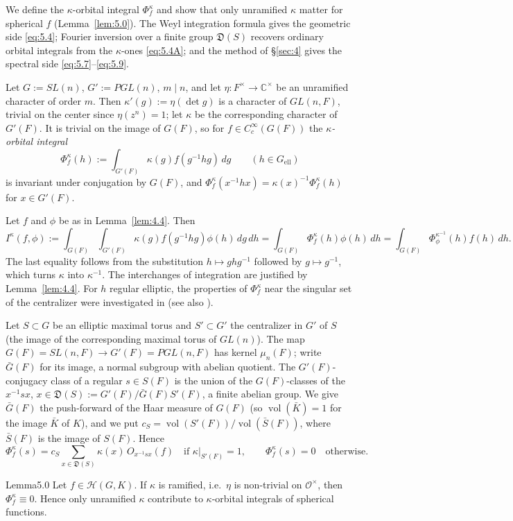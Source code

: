 \documentclass[12pt,letterpaper]{article}
\numberwithin{equation}{section}
\theoremstyle{plain}
\theoremstyle{remark}
\theoremstyle{plain}
\theoremstyle{definition}
\theoremstyle{remark}
\theoremstyle{remark}
\newcommand{\OO}{\mathcal{O}}
\newcommand{\Hc}{\mathcal{H}}
\DeclareMathOperator{\vol}{vol}
\newcommand{\ellr}{\mathrm{ell}}
\begin{document}
We define the $\kappa$-orbital integral $\Phi^\kappa_f$ and show that only unramified $\kappa$ matter for spherical $f$ (Lemma~\ref{lem:5.0}). The Weyl integration formula gives the geometric side \eqref{eq:5.4}; Fourier inversion over a finite group $\mathfrak D(S)$ recovers ordinary orbital integrals from the $\kappa$-ones \eqref{eq:5.4A}; and the method of \S\ref{sec:4} gives the spectral side \eqref{eq:5.7}--\eqref{eq:5.9}.


Let $G:=SL(n)$, $G':=PGL(n)$, $m\mid n$, and let $\eta:F^\times\to\mathbb{C}^\times$ be an unramified character of order $m$. Then $\kappa'(g):=\eta(\det g)$ is a character of $GL(n,F)$, trivial on the center since $\eta(z^n)=1$; let $\kappa$ be the corresponding character of $G'(F)$. It is trivial on the image of $G(F)$, so for $f\in C_c^\infty(G(F))$ the \emph{$\kappa$-orbital integral}
\[
\Phi^\kappa_f(h):=\int_{G'(F)}\kappa(g)f(g^{-1}hg)\,dg\qquad(h\in G_{\ellr})
\]
is invariant under conjugation by $G(F)$, and $\Phi^\kappa_f(x^{-1}hx)=\kappa(x)^{-1}\Phi^\kappa_f(h)$ for $x\in G'(F)$.

Let $f$ and $\phi$ be as in Lemma~\ref{lem:4.4}. Then
\begin{equation}\label{eq:5.1}
I^\kappa(f,\phi):=\int_{G(F)}\int_{G'(F)}\kappa(g)f(g^{-1}hg)\phi(h)\,dg\,dh=\int_{G(F)}\Phi^\kappa_f(h)\phi(h)\,dh=\int_{G(F)}\Phi^{\kappa^{-1}}_\phi(h)f(h)\,dh.
\end{equation}
The last equality follows from the substitution $h\mapsto ghg^{-1}$ followed by $g\mapsto g^{-1}$, which turns $\kappa$ into $\kappa^{-1}$. The interchanges of integration are justified by Lemma~\ref{lem:4.4}. For $h$ regular elliptic, the properties of $\Phi^\kappa_f$ near the singular set of the centralizer were investigated in \cite{Ka84} (see also \cite{He86}).

Let $S\subset G$ be an elliptic maximal torus and $S'\subset G'$ the centralizer in $G'$ of $S$ (the image of the corresponding maximal torus of $GL(n)$). The map $G(F)=SL(n,F)\to G'(F)=PGL(n,F)$ has kernel $\mu_n(F)$; write $\bar G(F)$ for its image, a normal subgroup with abelian quotient. The $G'(F)$-conjugacy class of a regular $s\in S(F)$ is the union of the $G(F)$-classes of the $x^{-1}sx$, $x\in\mathfrak D(S):=G'(F)/\bar G(F)S'(F)$, a finite abelian group. We give $\bar G(F)$ the push-forward of the Haar measure of $G(F)$ (so $\vol(\bar K)=1$ for the image $\bar K$ of $K$), and we put $c_S=\vol(S'(F))/\vol(\bar S(F))$, where $\bar S(F)$ is the image of $S(F)$. Hence
\begin{equation}\label{eq:5.2}
\Phi^\kappa_f(s)=c_S\sum_{x\in\mathfrak D(S)}\kappa(x)\,O_{x^{-1}sx}(f)\quad\text{if }\kappa|_{S'(F)}=1,\qquad\Phi^\kappa_f(s)=0\quad\text{otherwise.}
\end{equation}
\begin{fixedplain}{Lemma}{5.0}\label{lem:5.0}
Let $f\in\Hc(G,K)$. If $\kappa$ is ramified, i.e.\ $\eta$ is non-trivial on $\OO^\times$, then $\Phi^\kappa_f\equiv0$. Hence only unramified $\kappa$ contribute to $\kappa$-orbital integrals of spherical functions.
\end{fixedplain}
\end{document}
